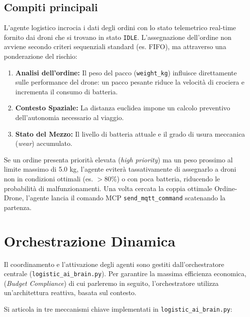 \subsection*{Compiti principali}
L'agente logistico incrocia i dati degli ordini con lo stato telemetrico real-time fornito dai droni che si trovano in stato \texttt{IDLE}. L'assegnazione dell'ordine non avviene secondo criteri sequenziali standard (es. FIFO), ma attraverso una ponderazione del rischio:
\begin{enumerate}
    \item \textbf{Analisi dell'ordine:} Il peso del pacco (\texttt{weight\_kg}) influisce direttamente sulle performance del drone: un pacco pesante riduce la velocità di crociera e incrementa il consumo di batteria.
    \item \textbf{Contesto Spaziale:} La distanza euclidea impone un calcolo preventivo dell'autonomia necessario al viaggio.
    \item \textbf{Stato del Mezzo:} Il livello di batteria attuale e il grado di usura meccanica (\textit{wear}) accumulato.
\end{enumerate}
Se un ordine presenta priorità elevata (\textit{high priority}) ma un peso prossimo al limite massimo di 5.0 kg, l'agente eviterà tassativamente di assegnarlo a droni non in condizioni ottimali (es. $>80\%$) o con poca batteria, riducendo le probabilità di malfunzionamenti. Una volta cercata la coppia ottimale Ordine-Drone, l'agente lancia il comando MCP \texttt{send\_mqtt\_command} scatenando la partenza.

\section{Orchestrazione Dinamica}
\label{sec:logistic_ai_brain}

Il coordinamento e l'attivazione degli agenti sono gestiti dall'orchestratore centrale (\texttt{logistic\_ai\_brain.py}). Per garantire la massima efficienza economica, (\textit{Budget Compliance}) di cui parleremo in seguito, l'orchestratore utilizza un'architettura reattiva, basata sul contesto.

Si articola in tre meccanismi chiave implementati in \texttt{logistic\_ai\_brain.py}:

